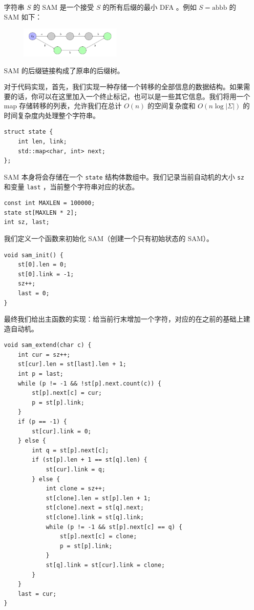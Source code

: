 字符串 $S$ 的 SAM 是一个接受 $S$ 的所有后缀的最小 DFA 。例如 $S=\text{abbb}$ 的 SAM 如下：
\begin{figure}[H]
    \centering
    \includegraphics[width=0.45\textwidth]{src/string/SAM.png}
    \label{sam}
\end{figure}
SAM 的后缀链接构成了原串的后缀树。

对于代码实现，首先，我们实现一种存储一个转移的全部信息的数据结构。如果需要的话，你可以在这里加入一个终止标记，也可以是一些其它信息。我们将用一个 map 存储转移的列表，允许我们在总计 $O(n)$ 的空间复杂度和 $O(n\log |\Sigma|)$ 的时间复杂度内处理整个字符串。
\begin{verbatim}
struct state {
    int len, link;
    std::map<char, int> next;
};
\end{verbatim}
SAM 本身将会存储在一个 \verb|state| 结构体数组中。我们记录当前自动机的大小 \verb|sz| 和变量 \verb|last| ，当前整个字符串对应的状态。
\begin{verbatim}
const int MAXLEN = 100000;
state st[MAXLEN * 2];
int sz, last;
\end{verbatim}
我们定义一个函数来初始化 SAM（创建一个只有初始状态的 SAM）。
\begin{verbatim}
void sam_init() {
    st[0].len = 0;
    st[0].link = -1;
    sz++;
    last = 0;
}
\end{verbatim}
最终我们给出主函数的实现：给当前行末增加一个字符，对应的在之前的基础上建造自动机。
\begin{verbatim}
void sam_extend(char c) {
    int cur = sz++;
    st[cur].len = st[last].len + 1;
    int p = last;
    while (p != -1 && !st[p].next.count(c)) {
        st[p].next[c] = cur;
        p = st[p].link;
    }
    if (p == -1) {
        st[cur].link = 0;
    } else {
        int q = st[p].next[c];
        if (st[p].len + 1 == st[q].len) {
            st[cur].link = q;
        } else {
            int clone = sz++;
            st[clone].len = st[p].len + 1;
            st[clone].next = st[q].next;
            st[clone].link = st[q].link;
            while (p != -1 && st[p].next[c] == q) {
                st[p].next[c] = clone;
                p = st[p].link;
            }
            st[q].link = st[cur].link = clone;
        }
    }
    last = cur;
}
\end{verbatim}